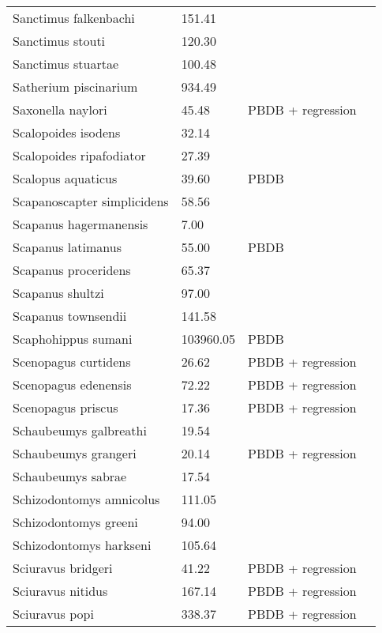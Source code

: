 \documentclass{article}
\begin{document}
\begin{center}
\begin{longtable}{p{} p{} p{} p{}}
    Sanctimus falkenbachi & 151.41 & \cite{Tomiya2013} &  \\ 
    Sanctimus stouti & 120.30 & \cite{Tomiya2013} &  \\ 
    Sanctimus stuartae & 100.48 & \cite{Tomiya2013} &  \\ 
    Satherium piscinarium & 934.49 & \cite{Tomiya2013} &  \\ 
    Saxonella naylori & 45.48 & PBDB + regression &  \\ 
    Scalopoides isodens & 32.14 & \cite{Tomiya2013} &  \\ 
    Scalopoides ripafodiator & 27.39 & \cite{Tomiya2013} &  \\ 
    Scalopus aquaticus & 39.60 & PBDB &  \\ 
    Scapanoscapter simplicidens & 58.56 & \cite{Tomiya2013} &  \\ 
    Scapanus hagermanensis & 7.00 & \cite{McKenna2011} &  \\ 
    Scapanus latimanus & 55.00 & PBDB &  \\ 
    Scapanus proceridens & 65.37 & \cite{Tomiya2013} &  \\ 
    Scapanus shultzi & 97.00 & \cite{McKenna2011} &  \\ 
    Scapanus townsendii & 141.58 & \cite{Smith2004} &  \\ 
    Scaphohippus sumani & 103960.05 & PBDB &  \\ 
    Scenopagus curtidens & 26.62 & PBDB + regression &  \\ 
    Scenopagus edenensis & 72.22 & PBDB + regression &  \\ 
    Scenopagus priscus & 17.36 & PBDB + regression &  \\ 
    Schaubeumys galbreathi & 19.54 & \cite{Loomis1911} &  \\ 
    Schaubeumys grangeri & 20.14 & PBDB + regression &  \\ 
    Schaubeumys sabrae & 17.54 & \cite{Matthew1901} &  \\ 
    Schizodontomys amnicolus & 111.05 & \cite{Tomiya2013} &  \\ 
    Schizodontomys greeni & 94.00 & \cite{McKenna2011} &  \\ 
    Schizodontomys harkseni & 105.64 & \cite{Tomiya2013} &  \\ 
    Sciuravus bridgeri & 41.22 & PBDB + regression &  \\ 
    Sciuravus nitidus & 167.14 & PBDB + regression &  \\ 
    Sciuravus popi & 338.37 & PBDB + regression &  \\ 

\end{longtable}
\end{center}
\end{document}
